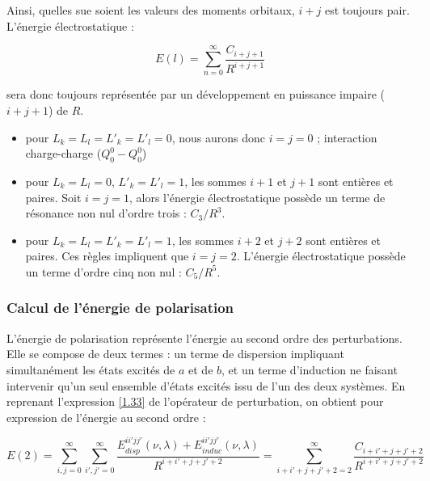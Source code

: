 \documentclass[12pt,a4paper]{book}
\begin{document}
	Ainsi, quelles sue soient les valeurs des moments orbitaux, $i + j$ est toujours pair. L'énergie électrostatique : 
	
	\begin{equation}
	E(l) = \sum_{n=0}^{\infty} \frac{C_{i+j+1}}{R^{i+j+1}}
	\end{equation}
	
	sera donc toujours représentée par un développement en puissance impaire ($i+ j + 1$) de $R$.
	
	\begin{itemize}
		\item pour $L_{k}=L_{l}=L'_{k}=L'_{l} = 0$, nous aurons donc $i=j=0$ ; interaction charge-charge ($Q_{0}^{0}- Q_{0}^{0}$)	
		\item pour $L_{k}=L_{l}=0$, $L'_{k}=L'_{l}=1$, les sommes $i+1$ et $j+1$ sont entières et paires. Soit $i=j=1$, alors l'énergie électrostatique possède un terme de résonance non nul d'ordre trois : $C_{3}/R^{3}$.
		\item pour $L_{k}=L_{l}=L'_{k}=L'_{l}=1$, les sommes $i+2$ et $j+2$ sont entières et paires. Ces règles impliquent que $i=j=2$. L'énergie électrostatique possède un terme d'ordre cinq non nul : $C_{5}/R^{5}$.
	\end{itemize}
	
	
	\subsubsection{Calcul de l’énergie de polarisation}
	
	L'énergie de polarisation représente l'énergie au second ordre des perturbations. Elle se compose de deux termes : un terme de dispersion impliquant simultanément les états excités de $a$ et de $b$, et un terme d'induction ne faisant intervenir qu'un seul ensemble d'états excités issu de l'un des deux systèmes. En reprenant l'expression \ref{1.33} de l'opérateur de perturbation, on obtient pour expression de l'énergie au second ordre : 
	
	\begin{equation}
	E(2) = \sum_{i,j=0}^{\infty} \sum_{i',j'=0}^{\infty} \frac{E_{disp}^{ii'jj'} (\nu , \lambda) + E_{induc}^{ii'jj'}(\nu , \lambda)}{R^{i+i'+j+j'+2}} = \sum_{i+i'+j+j'+2=2}^{\infty} \frac{C_{i+i'+j+j'+2}}{R^{i+i'+j+j'+2}} \label{2.21}
	\end{equation}
	
\end{document}
